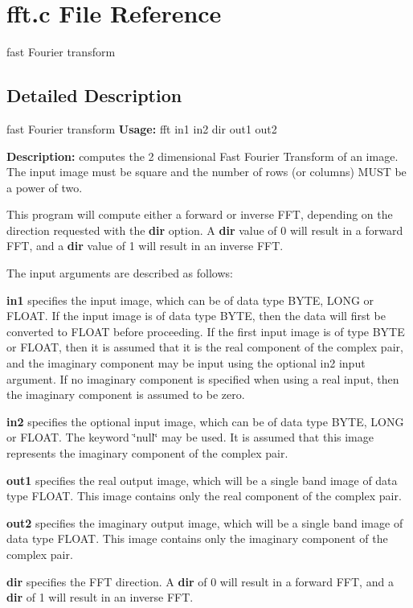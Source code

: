 \section{fft.c File Reference}
\label{fft_8c}


fast Fourier transform  




\subsection{Detailed Description}
fast Fourier transform {\bfseries Usage:} fft in1 in2 dir out1 out2

{\bfseries Description:} computes the 2 dimensional Fast Fourier Transform of an image. The input image must be square and the number of rows (or columns) MUST be a power of two.

This program will compute either a forward or inverse FFT, depending on the direction requested with the {\bfseries dir} option. A {\bfseries dir} value of 0 will result in a forward FFT, and a {\bfseries dir} value of 1 will result in an inverse FFT.

The input arguments are described as follows:

{\bfseries in1} specifies the input image, which can be of data type BYTE, LONG or FLOAT. If the input image is of data type BYTE, then the data will first be converted to FLOAT before proceeding. If the first input image is of type BYTE or FLOAT, then it is assumed that it is the real component of the complex pair, and the imaginary component may be input using the optional in2 input argument. If no imaginary component is specified when using a real input, then the imaginary component is assumed to be zero.

{\bfseries in2} specifies the optional input image, which can be of data type BYTE, LONG or FLOAT. The keyword \char`\"{}null\char`\"{} may be used. It is assumed that this image represents the imaginary component of the complex pair.

{\bfseries out1} specifies the real output image, which will be a single band image of data type FLOAT. This image contains only the real component of the complex pair.

{\bfseries out2} specifies the imaginary output image, which will be a single band image of data type FLOAT. This image contains only the imaginary component of the complex pair.

{\bfseries dir} specifies the FFT direction. A {\bfseries dir} of 0 will result in a forward FFT, and a {\bfseries dir} of 1 will result in an inverse FFT.

